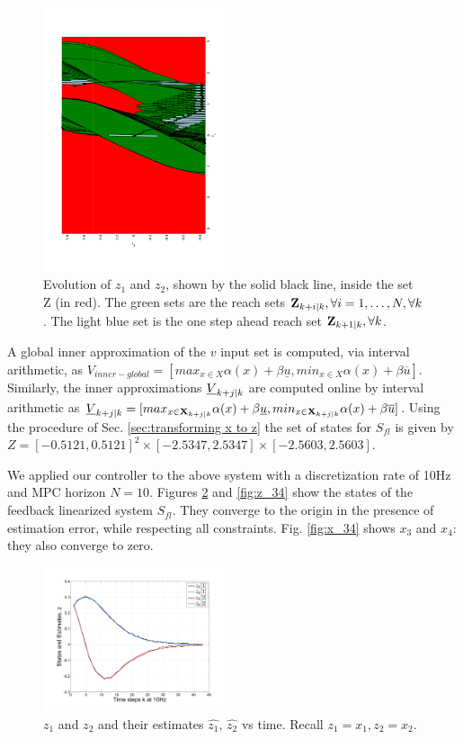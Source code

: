 \begin{figure}
	\includegraphics[angle=270,width=0.49\textwidth]{figs/z_trajectory_new.pdf}
	\caption{Evolution of $z_1$ and $z_2$, shown by the solid black line, inside the set Z (in red). The green sets are the reach sets $\mathbf{Z}_{k+i|k},\forall i=1,\dotsc,N, \forall k$. The light blue set is the one step ahead reach set $\mathbf{Z}_{k+1|k},\forall k$.}
	\label{fig:z_new_toy}
\end{figure}

A global inner approximation of the $v$ input set is computed, via interval arithmetic, as $V_{inner-global} = [max_{x\in X}\alpha(x) + \beta \underline{u}, min_{x\in X}\alpha(x) + \beta \overline{u}]$. 
Similarly, the inner approximations $\underline{V}_{k+j|k}$ are computed online by interval arithmetic as $\underline{V}_{k+j|k} = [max_{x\in \mathbf{X}_{k+j|k}} \alpha(x) + \beta \underline{u},  min_{x\in \mathbf{X}_{k+j|k}}\alpha(x) + \beta \overline{u}]$. 
Using the procedure of Sec. \ref{sec:transforming x to z} the set of states for $S_{fl}$ is given by $Z = [-0.5121, 0.5121]^2 \times [-2.5347, 2.5347] \times [-2.5603, 2.5603]$.

We applied our controller to the above system with a discretization rate of 10Hz and MPC horizon $N=10$.
Figures \ref{fig:z_12} and \ref{fig:z_34} show the states of the feedback linearized system $S_{fl}$. 
They converge to the origin in the presence of estimation error, while respecting all constraints.
Fig. \ref{fig:x_34} shows $x_3$ and $x_4$: they also converge to zero.
\begin{figure}
\includegraphics[width=0.49\textwidth]{figs/z_1n2_manip.pdf}
\caption{$z_1$ and $z_2$ and their estimates $\hat{z_1}, \, \hat{z_2}$ vs time. Recall $z_1=x_1, z_2 = x_2$.}
\label{fig:z_12}
\end{figure}

